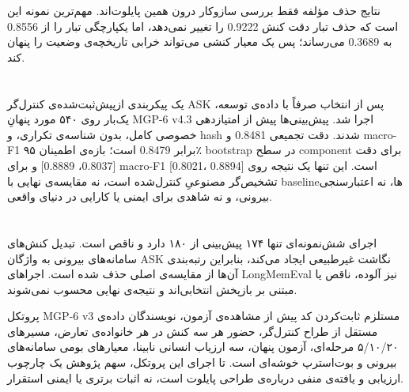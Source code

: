 نتایج حذف مؤلفه فقط بررسی سازوکار درون همین پایلوت‌اند. مهم‌ترین نمونه این
است که حذف تبار دقت کنش 0.9222 را تغییر نمی‌دهد، اما یکپارچگی تبار را از
0.8556 به 0.3689 می‌رساند؛ پس یک معیار کنشی می‌تواند خرابی تاریخچه‌ی وضعیت
را پنهان کند.

\section{}\label{ux627ux62cux631ux627ux6cc-ux646ux647ux627ux6ccux6cc-mgp-6-v4.3}

یک پیکربندی ازپیش‌ثبت‌شده‌ی کنترل‌گر ASK پس از انتخاب صرفاً با داده‌ی توسعه،
یک‌بار روی ۵۴۰ مورد پنهانِ MGP-6 v4.3 اجرا شد. پیش‌بینی‌ها پیش از امتیازدهی
خصوصی کامل، بدون شناسه‌ی تکراری، و hash شدند. دقت تجمیعی 0.8481 و
macro-F1 برابر 0.8479 است؛ بازه‌ی اطمینان ۹۵٪ bootstrap در سطح component
برای دقت {[}0.8037، 0.8889{]} و برای macro-F1 {[}0.8021، 0.8894{]} است.
این تنها یک نتیجه روی تشخیص‌گر مصنوعیِ کنترل‌شده است، نه مقایسه‌ی نهایی با
baselineها، نه اعتبارسنجی بیرونی، و نه شاهدی برای ایمنی یا کارایی در
دنیای واقعی.

\section{}\label{ux645ux631ux632-ux627ux62fux639ux627-ux648-ux645ux633ux6ccux631-ux62aux623ux6ccux6ccux62f}

اجرای شش‌نمونه‌ای تنها ۱۷۴ پیش‌بینی از ۱۸۰ دارد و ناقص است. تبدیل کنش‌های
سامانه‌های بیرونی به واژگان ASK نگاشت غیرطبیعی ایجاد می‌کند، بنابراین
رتبه‌بندی آن‌ها از مقایسه‌ی اصلی حذف شده است. اجراهای LongMemEval نیز
آلوده، ناقص یا مبتنی بر بازپخش انتخابی‌اند و نتیجه‌ی نهایی محسوب نمی‌شوند.

پروتکل MGP-6 v3 مستلزم ثابت‌کردن کد پیش از مشاهده‌ی آزمون، نویسندگان داده‌ی
مستقل از طراح کنترل‌گر، حضور هر سه کنش در هر خانواده‌ی تعارض، مسیرهای
۵/۱۰/۲۰ مرحله‌ای، آزمون پنهان، سه ارزیاب انسانی نابینا، معیارهای بومی
سامانه‌های بیرونی و بوت‌استرپ خوشه‌ای است. تا اجرای این پروتکل، سهم پژوهش
یک چارچوب ارزیابی و یافته‌ی منفی درباره‌ی طراحی پایلوت است، نه اثبات برتری
یا ایمنی استقرار.
